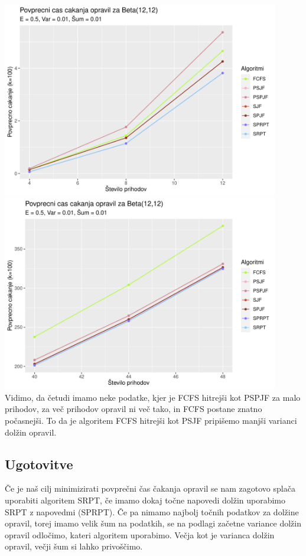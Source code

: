\documentclass[a4paper, pt14]{article}
\begin{document}
\includegraphics[width=12.1cm,keepaspectratio]{Beta_grafi_razclenitev1.pdf}
\includegraphics[width=12.1cm,keepaspectratio]{Beta_grafi_razclenitev2.pdf}
\\Vidimo, da četudi imamo neke podatke, kjer je FCFS hitrejši kot PSPJF za malo prihodov, za več prihodov opravil ni več tako, in FCFS postane znatno počasnejši. To da je algoritem FCFS hitrejši kot PSJF pripišemo manjši varianci dolžin opravil.

\subsection{Ugotovitve}
Če je naš cilj minimizirati povprečni čas čakanja opravil se nam zagotovo splača uporabiti algoritem SRPT, če imamo dokaj točne napovedi dolžin uporabimo SRPT z napovedmi (SPRPT). Če pa nimamo najbolj točnih podatkov za dolžine opravil, torej imamo velik šum na podatkih, se na podlagi začetne variance dolžin opravil odločimo, kateri algoritem uporabimo. Večja kot je varianca dolžin opravil, večji šum si lahko privoščimo.
 
\end{document}
